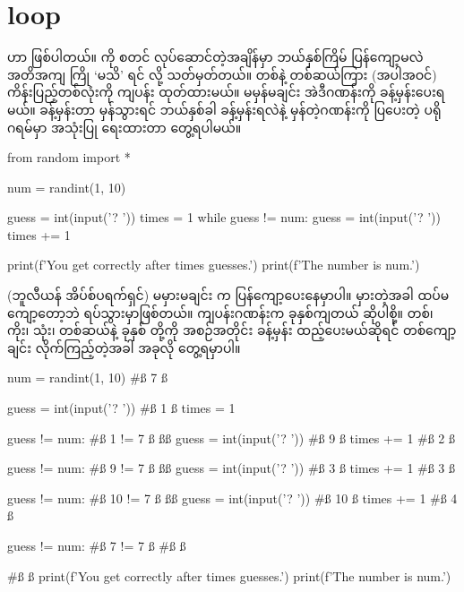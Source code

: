 \section{ loop}
  ဟာ  ဖြစ်ပါတယ်။  ကို စတင် လုပ်ဆောင်တဲ့အချိန်မှာ ဘယ်နှစ်ကြိမ် ပြန်ကျော့မလဲ အတိအကျ ကြို ‘မသိ’ ရင်   လို့ သတ်မှတ်တယ်။ တစ်နဲ့ တစ်ဆယ်ကြား (အပါအဝင်) ကိန်းပြည့်တစ်လုံးကို ကျပန်း  ထုတ်ထားမယ်။ မမှန်မချင်း အဲဒီဂဏန်းကို ခန့်မှန်းပေးရမယ်။ ခန့်မှန်းတာ မှန်သွားရင် ဘယ်နှစ်ခါ ခန့်မှန်းရလဲနဲ့ မှန်တဲ့ဂဏန်းကို ပြပေးတဲ့ ပရိုဂရမ်မှာ   အသုံးပြု ရေးထားတာ တွေ့ရပါမယ်။

%
\begin{py}
from random import *

num = randint(1, 10)

guess = int(input('? '))
times = 1
while guess != num:
    guess = int(input('? '))
    times += 1

print(f'You get correctly after {times} guesses.')
print(f'The number is {num}.')
\end{py}
%

 (ဘူလီယန် အိပ်စ်ပရက်ရှင်) မမှားမချင်း  က ပြန်ကျော့ပေးနေမှာပါ။ မှားတဲ့အခါ ထပ်မကျော့တော့ဘဲ ရပ်သွားမှာဖြစ်တယ်။ ကျပန်းဂဏန်းက ခုနှစ်ကျတယ် ဆိုပါစို့။ တစ်၊ ကိုး၊ သုံး၊ တစ်ဆယ်နဲ့ ခုနှစ် တို့ကို အစဉ်အတိုင်း ခန့်မှန်း ထည့်ပေးမယ်ဆိုရင် တစ်ကျော့ချင်း လိုက်ကြည့်တဲ့အခါ အခုလို တွေ့ရမှာပါ။

%
\begin{py}
num = randint(1, 10)            #ß 7 ß

guess = int(input('? '))        #ß 1 ß
times = 1

guess != num:                   #ß 1 != 7 ß
    ßß
    guess = int(input('? '))    #ß 9 ß
    times += 1                  #ß 2 ß

guess != num:                   #ß 9 != 7 ß
    ßß
    guess = int(input('? '))    #ß 3 ß
    times += 1                  #ß 3 ß

guess != num:                   #ß 10 != 7 ß
    ßß
    guess = int(input('? '))    #ß 10 ß
    times += 1                  #ß 4 ß

guess != num:                   #ß 7 != 7 ß
    #ß ß

#ß ß
print(f'You get correctly after {times} guesses.')
print(f'The number is {num}.')  
\end{py}
%

